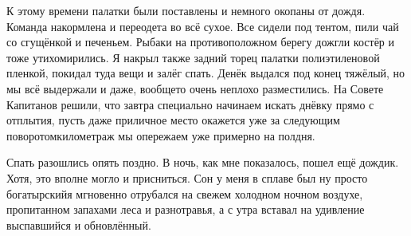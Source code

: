 К этому времени палатки были поставлены и немного окопаны от дождя. Команда накормлена и переодета во всё сухое. Все сидели под тентом, пили чай со сгущёнкой и печеньем. Рыбаки на противоположном берегу дожгли костёр и тоже утихомирились. Я накрыл также задний торец палатки полиэтиленовой пленкой, покидал туда вещи и залёг спать. Денёк выдался под конец тяжёлый, но мы всё выдержали и даже, вообще\sdash то очень неплохо разместились. На Совете Капитанов решили, что завтра специально начинаем искать днёвку прямо с отплытия, пусть даже приличное место окажется уже за следующим поворотом\mdash километраж мы опережаем уже примерно на полдня. 

Спать разошлись опять поздно. В ночь, как мне показалось, пошел ещё дождик. Хотя, это вполне могло и присниться. Сон у меня в сплаве был ну просто богатырский\mdash я мгновенно отрубался на свежем холодном ночном воздухе, пропитанном запахами леса и разнотравья, а с утра вставал на удивление выспавшийся и обновлённый.

\begin{center}
\end{center}

